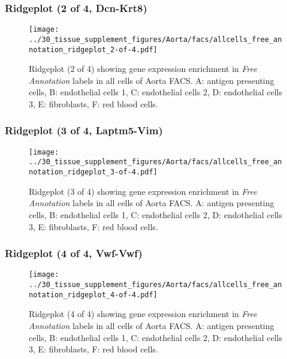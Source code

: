 \clearpage

\subsubsection{Ridgeplot (2 of 4, Dcn-Krt8)}
\begin{figure}[h]
\centering
\texttt{[image: ../30\_tissue\_supplement\_figures/Aorta/facs/allcells\_free\_annotation\_ridgeplot\_2-of-4.pdf]}

\caption{ Ridgeplot (2 of 4)  showing gene expression enrichment in \emph{Free Annotation} labels in all cells of Aorta FACS. A: antigen presenting cells, B: endothelial cells 1, C: endothelial cells 2, D: endothelial cells 3, E: fibroblasts, F: red blood cells.}
\end{figure}


\clearpage

\subsubsection{Ridgeplot (3 of 4, Laptm5-Vim)}
\begin{figure}[h]
\centering
\texttt{[image: ../30\_tissue\_supplement\_figures/Aorta/facs/allcells\_free\_annotation\_ridgeplot\_3-of-4.pdf]}

\caption{ Ridgeplot (3 of 4)  showing gene expression enrichment in \emph{Free Annotation} labels in all cells of Aorta FACS. A: antigen presenting cells, B: endothelial cells 1, C: endothelial cells 2, D: endothelial cells 3, E: fibroblasts, F: red blood cells.}
\end{figure}


\clearpage

\subsubsection{Ridgeplot (4 of 4, Vwf-Vwf)}
\begin{figure}[h]
\centering
\texttt{[image: ../30\_tissue\_supplement\_figures/Aorta/facs/allcells\_free\_annotation\_ridgeplot\_4-of-4.pdf]}

\caption{ Ridgeplot (4 of 4)  showing gene expression enrichment in \emph{Free Annotation} labels in all cells of Aorta FACS. A: antigen presenting cells, B: endothelial cells 1, C: endothelial cells 2, D: endothelial cells 3, E: fibroblasts, F: red blood cells.}
\end{figure}


\clearpage

